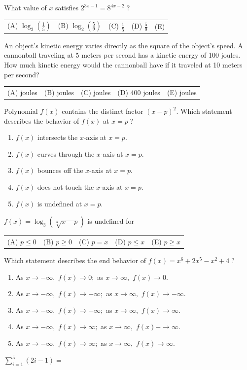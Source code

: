 \documentclass[letterstyle,12pt]{extarticle}
\newcounter{qcounter}
\newcommand{\choices}[5]{
\vspace{0.8em} 
\begin{enumerate}[label=(\Alph*)]
\setlength\itemsep{1em} 
\item
#1 
\item 
#2
\item
#3
\item
#4
\item
#5
\end{enumerate}
}
\newcommand{\choicesline}[5]{    
\vspace{2em} \break 
\begin{tabularx}{0.95 \textwidth} { 
>{\arraybackslash}X 
>{\arraybackslash}X 
>{\arraybackslash}X 
>{\arraybackslash}X 
>{\arraybackslash}X }
(A) \; #1
& 
(B) \; #2
& 
(C) \; #3
& 
(D) \; #4
&
(E) \; #5 
\end{tabularx}
\vspace{2em} \break
}
\newcommand{\ans}[1]{{\color{black} #1}}
\newenvironment{question}
    {\begin{minipage}{0.9 \textwidth}
        \item
    }
    { 
    \end{minipage} \vspace{4ex}
    }
\begin{document}
\begin{list}{\textbf{.}~}{}
\begin{question}
What value of \(x\) satisfies \(2^{3x - 1} = 8^{4x - 2} \; ?\) \\
\choicesline
{\(\log_2 \left(\frac{1}{5}\right)\)}
{\(\log_2 \left(\frac{5}{9}\right)\)}
{\(\frac{1}{5}\)}
{\ans{\(\frac{5}{9}\)}}
{1}
\end{question}

\begin{question}
An object's kinetic energy varies directly as the square of the object's speed. A cannonball traveling at 5 meters per second has a kinetic energy of 100 joules. How much kinetic energy would the cannonball have if it traveled at 10 meters per second?
\choicesline
{40 joules}
{100 joules}
{200 joules}
{\ans{400 joules}}
{2000 joules}
\end{question}

\begin{question}
Polynomial \(f(x)\) contains the distinct factor \((x - p)^2.\)
Which statement describes the behavior of \(f(x)\) at \(x = p \; ?\)
\choices
{\(f(x)\) intersects the \(x\)-axis at \(x = p.\)}
{\(f(x)\) curves through the \(x\)-axis at \(x = p.\)}
{\ans{\(f(x)\) bounces off the \(x\)-axis at \(x = p.\)}}
{\(f(x)\) does not touch the \(x\)-axis at \(x = p.\)}
{\(f(x)\) is undefined at \(x = p.\)}
\end{question}

\begin{question}
\(f(x) = \log_3(\sqrt[3]{x - p})\) is undefined for \\
\choicesline
{\(p \leqslant 0\)}
{\(p \geqslant 0\)}
{\(p = x\)}
{\(p \leqslant x\)}
{\ans{\(p \geqslant x\)}}
\end{question}

\begin{question}
Which statement describes the end behavior of \(f(x) = x^6 + 2x^5 - x^2 + 4 \; ?\)
\choices
{As \(x \to -\infty,\) \(f(x) \to 0;\) as \(x \to \infty,\) \(f(x) \to 0.\)}
{As \(x \to -\infty,\) \(f(x) \to -\infty;\) as \(x \to \infty,\) \(f(x) \to -\infty.\)}
{As \(x \to -\infty,\) \(f(x) \to -\infty;\) as \(x \to \infty,\) \(f(x) \to \infty.\)}
{As \(x \to -\infty,\) \(f(x) \to \infty;\) as \(x \to \infty,\) \(f(x) -\to \infty.\)}
{\ans{As \(x \to -\infty,\) \(f(x) \to \infty;\) as \(x \to \infty,\) \(f(x) \to \infty.\)}}
\end{question}

\begin{question}
\(\sum_{i = 1}^5 (2i - 1) =\)


\end{question}
\end{list}
\end{document}
